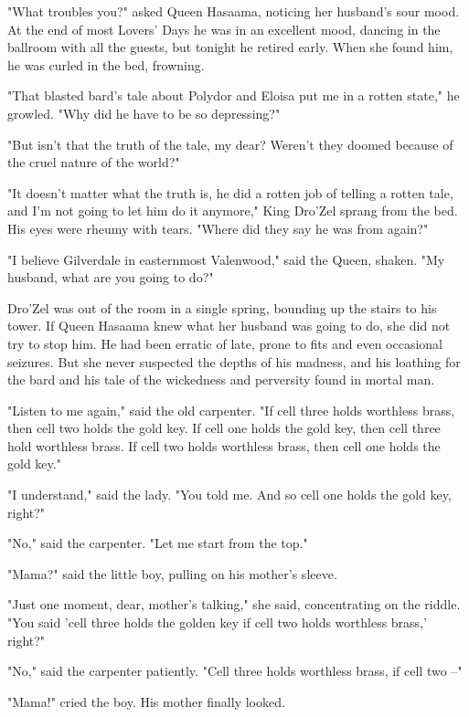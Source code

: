 "What troubles you?" asked Queen Hasaama, noticing her husband's sour mood. At the end of most Lovers' Days he was in an excellent mood, dancing in the ballroom with all the guests, but tonight he retired early. When she found him, he was curled in the bed, frowning.

"That blasted bard's tale about Polydor and Eloisa put me in a rotten state," he growled. "Why did he have to be so depressing?"

"But isn't that the truth of the tale, my dear? Weren't they doomed because of the cruel nature of the world?"

"It doesn't matter what the truth is, he did a rotten job of telling a rotten tale, and I'm not going to let him do it anymore," King Dro'Zel sprang from the bed. His eyes were rheumy with tears. "Where did they say he was from again?"

"I believe Gilverdale in easternmost Valenwood," said the Queen, shaken. "My husband, what are you going to do?"

Dro'Zel was out of the room in a single spring, bounding up the stairs to his tower. If Queen Hasaama knew what her husband was going to do, she did not try to stop him. He had been erratic of late, prone to fits and even occasional seizures. But she never suspected the depths of his madness, and his loathing for the bard and his tale of the wickedness and perversity found in mortal man.

"Listen to me again," said the old carpenter. "If cell three holds worthless brass, then cell two holds the gold key. If cell one holds the gold key, then cell three hold worthless brass. If cell two holds worthless brass, then cell one holds the gold key."

"I understand," said the lady. "You told me. And so cell one holds the gold key, right?"

"No," said the carpenter. "Let me start from the top."

"Mama?" said the little boy, pulling on his mother's sleeve.

"Just one moment, dear, mother's talking," she said, concentrating on the riddle. "You said 'cell three holds the golden key if cell two holds worthless brass,' right?"

"No," said the carpenter patiently. "Cell three holds worthless brass, if cell two --"

"Mama!" cried the boy. His mother finally looked.


